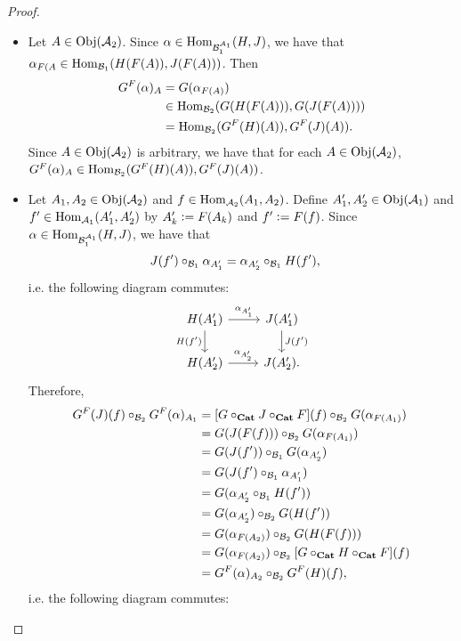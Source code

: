 \documentclass{book}
\begin{document}
	\begin{proof}\
		\begin{itemize}
			\item Let $A \in \operatorname{Obj}(\mathcal{A}_2)$. Since $\alpha \in \operatorname{Hom}_{\mathcal{B}_1^{\mathcal{A}_1}}(H,J)$, we have that $\alpha_{F(A} \in \operatorname{Hom}_{\mathcal{B}_1}(H(F(A)), J(F(A)))$. Then
			\begin{align*}
				G^F(\alpha)_A
				& = G(\alpha_{F(A)}) \\
				& \in \operatorname{Hom}_{\mathcal{B}_2}(G(H(F(A))), G(J(F(A)))) \\
				& = \operatorname{Hom}_{\mathcal{B}_2}(G^F(H)(A)), G^F(J)(A)).
			\end{align*}
			Since $A \in \operatorname{Obj}(\mathcal{A}_2)$ is arbitrary, we have that for each $A \in \operatorname{Obj}(\mathcal{A}_2)$, $G^F(\alpha)_A \in \operatorname{Hom}_{\mathcal{B}_2}(G^F(H)(A)), G^F(J)(A))$.
			\item Let $A_1, A_2 \in \operatorname{Obj}(\mathcal{A}_2)$ and $f \in \operatorname{Hom}_{\mathcal{A}_2}(A_1, A_2)$. Define $A'_1, A'_2 \in \operatorname{Obj}(\mathcal{A}_1)$ and $f' \in \operatorname{Hom}_{\mathcal{A}_1}(A'_1, A'_2)$ by $A'_k \vcentcolon= F(A_k)$ and $f' \vcentcolon= F(f)$. Since $\alpha \in \operatorname{Hom}_{\mathcal{B}_1^{\mathcal{A}_1}}(H,J)$, we have that
			\begin{align*}
				J(f') \circ_{\mathcal{B}_1} \alpha_{A'_1}
				& = \alpha_{A'_2} \circ_{\mathcal{B}_1} H(f'),
			\end{align*}
			i.e. the following diagram commutes:
			\[
			\begin{tikzcd}
				H(A'_1)  \arrow[r, "\al_{A'_1}"] \arrow[d, "{H(f')}"'] & J(A'_1) \arrow[d, "{J(f')}"] \\
				H(A'_2) \arrow[r, "\al_{A'_2}"] &  J(A'_2).
			\end{tikzcd}
			\]
			Therefore,
			\begin{align*}
				G^F(J)(f) \circ_{\mathcal{B}_2} G^F(\alpha)_{A_1}
				& = [G \circ_{\operatorname*{\text{\textbf{Cat}}}} J \circ_{\operatorname*{\text{\textbf{Cat}}}} F](f) \circ_{\mathcal{B}_2} G(\alpha_{F(A_1)}) \\
				& = G(J(F(f))) \circ_{\mathcal{B}_2} G(\alpha_{F(A_1)}) \\
				& = G(J(f')) \circ_{\mathcal{B}_1} G(\alpha_{A'_2}) \\
				& = G(J(f') \circ_{\mathcal{B}_1} \alpha_{A'_1}) \\
				& = G(\alpha_{A'_2} \circ_{\mathcal{B}_1} H(f')) \\
				& = G(\alpha_{A'_2}) \circ_{\mathcal{B}_2} G(H(f')) \\
				& = G(\alpha_{F(A_2)}) \circ_{\mathcal{B}_2} G(H(F(f))) \\
				& = G(\alpha_{F(A_2)}) \circ_{\mathcal{B}_2} [G \circ_{\operatorname*{\text{\textbf{Cat}}}} H \circ_{\operatorname*{\text{\textbf{Cat}}}} F](f) \\
				& = G^F(\alpha)_{A_2} \circ_{\mathcal{B}_2} G^F(H)(f),
			\end{align*}
			i.e. the following diagram commutes:

\end{itemize}
\end{proof}
\end{document}
